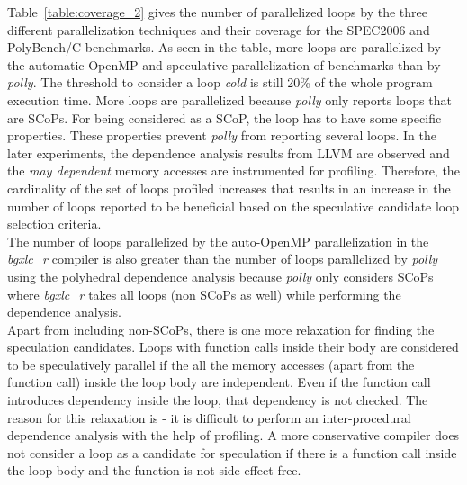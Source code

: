 \documentclass[10pt]{report}          %
\begin{document}
Table~\ref{table:coverage_2} gives the number of parallelized loops by the three different parallelization techniques and their coverage for the SPEC2006 and PolyBench/C benchmarks.  As seen in the table, more loops are parallelized by the automatic OpenMP and speculative parallelization of benchmarks than by \textit{polly}.  The threshold to consider a loop \textit{cold} is still 20\% of the whole program execution time.  More loops are parallelized because \textit{polly} only reports loops that are SCoPs.  For being considered as a SCoP, the loop has to have some specific properties.  These properties prevent \textit{polly} from reporting several loops.  In the later experiments, the dependence analysis results from LLVM are observed and the \textit{may dependent} memory accesses are instrumented for profiling.  Therefore, the cardinality of the set of loops profiled increases that results in an increase in the number of loops reported to be beneficial based on the speculative candidate loop selection criteria.\\
The number of loops parallelized by the auto-OpenMP parallelization in the \textit{bgxlc\_r} compiler is also greater than the number of loops parallelized by \textit{polly} using the polyhedral dependence analysis because \textit{polly} only considers SCoPs where \textit{bgxlc\_r} takes all loops (non SCoPs as well) while performing the dependence analysis.\\
Apart from including non-SCoPs, there is one more relaxation for finding the speculation candidates.  Loops with function calls inside their body are considered to be speculatively parallel if the all the memory accesses (apart from the function call) inside the loop body are independent.  Even if the function call introduces dependency inside the loop, that dependency is not checked.  The reason for this relaxation is - it is difficult to perform an inter-procedural dependence analysis with the help of profiling.  A more conservative compiler does not consider a loop as a candidate for speculation if there is a function call inside the loop body and the function is not side-effect free. \\
\end{document}
